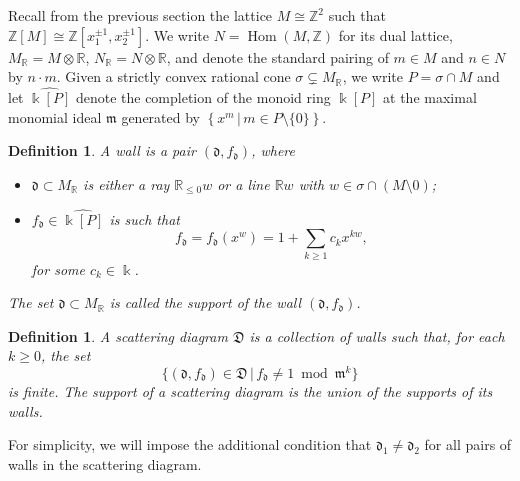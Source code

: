 \documentclass[10pt]{amsart}
\newtheorem{defn}[theorem]{Definition}
\theoremstyle{remark}
\numberwithin{equation}{section}
\newcommand{\RR}{\mathbb{R}}
\newcommand{\ZZ}{\mathbb{Z}}
\newcommand{\fd}{\mathfrak{d}}
\newcommand{\fD}{\mathfrak{D}}
\newcommand{\fm}{\mathfrak{m}}
\newcommand{\Hom}{\operatorname{Hom}}
\begin{document}

Recall from the previous section the lattice $M \cong \ZZ^2$ such that $\ZZ[M] \cong \ZZ[x_1^{\pm 1}, x_2^{\pm 1}]$.  We write $N = \Hom (M, \ZZ)$ for its dual lattice, $M_{\RR} = M\otimes\RR$, $N_{\RR} = N\otimes\RR$, and denote the standard pairing of $m\in M$ and $n\in N$ by $n \cdot m$.  Given a strictly convex rational cone $\sigma \subsetneq M_{\RR}$, we write $P=\sigma \cap M$ and let $\widehat{\Bbbk[P]}$ denote the completion of the monoid ring $\Bbbk[P]$ at the maximal monomial ideal $\fm$ generated by $\left\{x^m \,|\, m\in P\setminus\{0\}\right\}$.

\begin{defn}
  \label{walldef}
  A \emph{wall} is a pair $(\fd, f_{\fd})$, where 
  \begin{itemize}

    \item 
      $\fd \subset M_{\mathbb{R}}$ is either a ray $\RR_{\le 0} w$ or a line
      $\RR w$ with $w\in \sigma \cap(M\setminus 0)$;

    \item 
      $f_{\fd} \in \widehat{\Bbbk [P]}$ is such that 
      \[ 
        f_{\fd} = f_{\fd}(x^w) = 1 + \sum_{k\geq 1} c_k x^{k w},
      \] 
      for some $c_k \in \Bbbk$. 
  \end{itemize}
  The set $\fd \subset M_{\mathbb{R}}$ is called the \emph{support} of the wall
  $(\fd, f_{\fd})$.
\end{defn}

\begin{defn}
  \label{def:scattering_diagram}
  A scattering diagram $\fD$ is a collection of walls such that, for each $k \geq
  0$, the set
  \[
    \{ (\fd, f_{\fd}) \in \fD\, |\, f_{\fd} \neq 1 \bmod \fm^k \}
  \]
  is finite. The support of a scattering diagram is the union of the supports of its walls.%
\end{defn}
For simplicity, we will impose the additional condition that $\fd_1\neq \fd_2$ for all pairs of walls in the scattering diagram.
\end{document}
